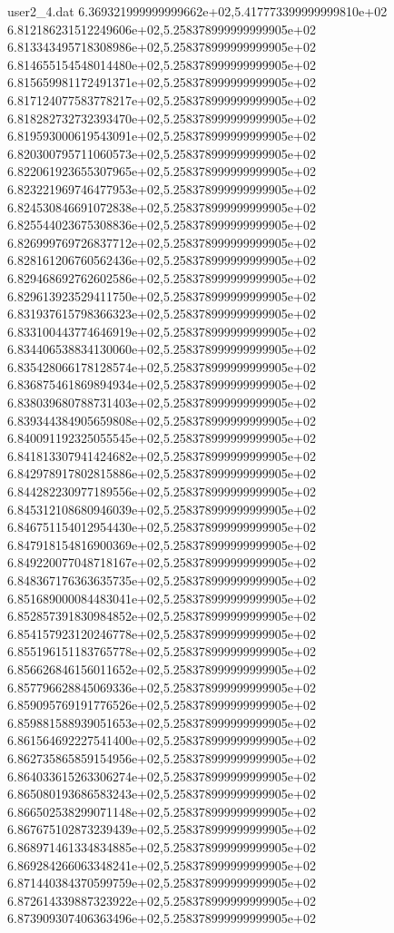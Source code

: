 \begin{filecontents}{user2_4.dat}
6.369321999999999662e+02,5.417773399999999810e+02
6.812186231512249606e+02,5.258378999999999905e+02
6.813343495718308986e+02,5.258378999999999905e+02
6.814655154548014480e+02,5.258378999999999905e+02
6.815659981172491371e+02,5.258378999999999905e+02
6.817124077583778217e+02,5.258378999999999905e+02
6.818282732732393470e+02,5.258378999999999905e+02
6.819593000619543091e+02,5.258378999999999905e+02
6.820300795711060573e+02,5.258378999999999905e+02
6.822061923655307965e+02,5.258378999999999905e+02
6.823221969746477953e+02,5.258378999999999905e+02
6.824530846691072838e+02,5.258378999999999905e+02
6.825544023675308836e+02,5.258378999999999905e+02
6.826999769726837712e+02,5.258378999999999905e+02
6.828161206760562436e+02,5.258378999999999905e+02
6.829468692762602586e+02,5.258378999999999905e+02
6.829613923529411750e+02,5.258378999999999905e+02
6.831937615798366323e+02,5.258378999999999905e+02
6.833100443774646919e+02,5.258378999999999905e+02
6.834406538834130060e+02,5.258378999999999905e+02
6.835428066178128574e+02,5.258378999999999905e+02
6.836875461869894934e+02,5.258378999999999905e+02
6.838039680788731403e+02,5.258378999999999905e+02
6.839344384905659808e+02,5.258378999999999905e+02
6.840091192325055545e+02,5.258378999999999905e+02
6.841813307941424682e+02,5.258378999999999905e+02
6.842978917802815886e+02,5.258378999999999905e+02
6.844282230977189556e+02,5.258378999999999905e+02
6.845312108680946039e+02,5.258378999999999905e+02
6.846751154012954430e+02,5.258378999999999905e+02
6.847918154816900369e+02,5.258378999999999905e+02
6.849220077048718167e+02,5.258378999999999905e+02
6.848367176363635735e+02,5.258378999999999905e+02
6.851689000084483041e+02,5.258378999999999905e+02
6.852857391830984852e+02,5.258378999999999905e+02
6.854157923120246778e+02,5.258378999999999905e+02
6.855196151183765778e+02,5.258378999999999905e+02
6.856626846156011652e+02,5.258378999999999905e+02
6.857796628845069336e+02,5.258378999999999905e+02
6.859095769191776526e+02,5.258378999999999905e+02
6.859881588939051653e+02,5.258378999999999905e+02
6.861564692227541400e+02,5.258378999999999905e+02
6.862735865859154956e+02,5.258378999999999905e+02
6.864033615263306274e+02,5.258378999999999905e+02
6.865080193686583243e+02,5.258378999999999905e+02
6.866502538299071148e+02,5.258378999999999905e+02
6.867675102873239439e+02,5.258378999999999905e+02
6.868971461334834885e+02,5.258378999999999905e+02
6.869284266063348241e+02,5.258378999999999905e+02
6.871440384370599759e+02,5.258378999999999905e+02
6.872614339887323922e+02,5.258378999999999905e+02
6.873909307406363496e+02,5.258378999999999905e+02

\end{filecontents}
